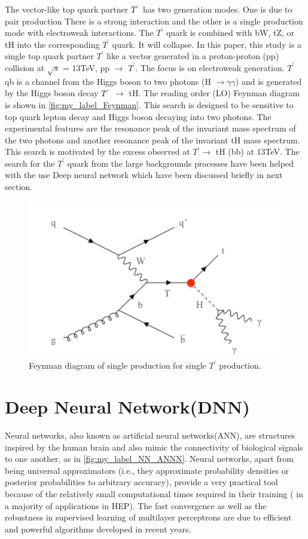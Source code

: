 The vector-like top quark partner $T^`$ has two generation modes. One is due to pair production  
 There is a strong interaction and the other is a single production mode with electroweak interactions. The $T^'$ quark is combined with bW, tZ, or tH into the corresponding $ T^'$ quark. 
 It will collapse. In this paper, this study is a single top quark partner $T^'$ like a vector generated in a proton-proton (pp) collision at $ \sqrt{s} $ = 13TeV, pp $\longrightarrow$ $T^'$. The focus is on electroweak generation. $T^'$ qb is a channel from the Higgs boson to two photons (H $\longrightarrow\gamma\gamma$) and is generated by the Higgs boson decay $T^`$ $\longrightarrow$ tH. The reading order (LO) Feynman diagram is shown in \autoref{fig:my_label_Feynman}. This search is designed to be sensitive to  top quark lepton decay and Higgs boson decaying into two photons. The experimental features are the resonance peak of the invariant mass spectrum of the two photons and another resonance peak of the invariant tH  mass spectrum. This search is motivated by the excess observed  at $T^'\longrightarrow$ tH (bb) at 13TeV. 
The search for the $T^'$ quark from the large backgrounds processes have been helped with the use Deep neural network which have been discussed briefly in next section.

\begin{figure}[H]
    \centering
    \includegraphics{figure_4/Fynnman.pdf}
    \caption{Feynman diagram of single production for single ${T^'}$ production.}
    \label{fig:my_label_Feynman}
\end{figure}

\section{Deep Neural Network(DNN)}
Neural networks, also known as artificial neural networks(ANN), are structures inspired
by the human brain and also mimic the connectivity of biological signals to one another, as in \autoref{fig:my_label_NN_ANNN}.
Neural networks, apart from being universal approximators (i.e., they approximate probability densities or posterior probabilities to arbitrary accuracy), provide a very practical tool because of the relatively small computational times required in their training ( in a majority of applications in HEP). The fast convergence as well as the robustness in supervised learning of multilayer perceptrons are due to efficient and powerful algorithms developed in recent years.

